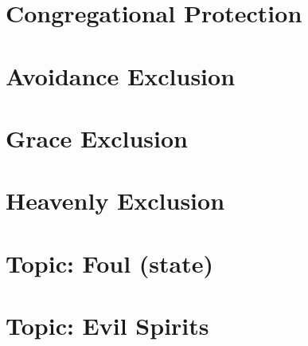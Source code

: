 \documentclass[a4paper,twocolumn,twoside,notitlepage,10pt]{article}
\begin{document}
\begin{description}[leftmargin=0pt]
  
  
  
  
  
  
  
  
  
  
  
  
  
  
  
  
  
  
  
  
  
  
  
  
  
  
  
  
  
  
  
  
  
  
  
  
  
  
  
  
  
  
  
  
  
  
  
  
  
  
  
  
  
  
  
\end{description}
\clearpage


\section{Congregational Protection}
\section{Avoidance Exclusion}
\section{Grace Exclusion}
\section{Heavenly Exclusion}
\section{Topic: Foul (state)}
\section{Topic: Evil Spirits}
\end{document}
